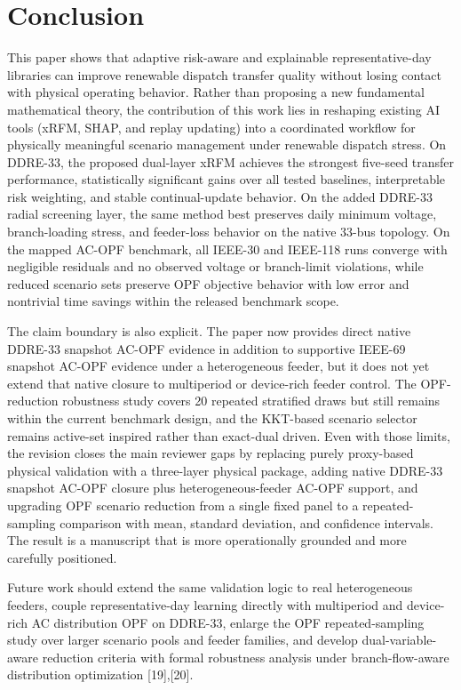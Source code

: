 \documentclass[journal]{IEEEtran}
\begin{document}
\section{Conclusion}
This paper shows that adaptive risk-aware and explainable representative-day libraries can improve renewable dispatch transfer quality without losing contact with physical operating behavior. Rather than proposing a new fundamental mathematical theory, the contribution of this work lies in reshaping existing AI tools (xRFM, SHAP, and replay updating) into a coordinated workflow for physically meaningful scenario management under renewable dispatch stress. On DDRE-33, the proposed dual-layer xRFM achieves the strongest five-seed transfer performance, statistically significant gains over all tested baselines, interpretable risk weighting, and stable continual-update behavior. On the added DDRE-33 radial screening layer, the same method best preserves daily minimum voltage, branch-loading stress, and feeder-loss behavior on the native 33-bus topology. On the mapped AC-OPF benchmark, all IEEE-30 and IEEE-118 runs converge with negligible residuals and no observed voltage or branch-limit violations, while reduced scenario sets preserve OPF objective behavior with low error and nontrivial time savings within the released benchmark scope.

The claim boundary is also explicit. The paper now provides direct native DDRE-33 snapshot AC-OPF evidence in addition to supportive IEEE-69 snapshot AC-OPF evidence under a heterogeneous feeder, but it does not yet extend that native closure to multiperiod or device-rich feeder control. The OPF-reduction robustness study covers 20 repeated stratified draws but still remains within the current benchmark design, and the KKT-based scenario selector remains active-set inspired rather than exact-dual driven. Even with those limits, the revision closes the main reviewer gaps by replacing purely proxy-based physical validation with a three-layer physical package, adding native DDRE-33 snapshot AC-OPF closure plus heterogeneous-feeder AC-OPF support, and upgrading OPF scenario reduction from a single fixed panel to a repeated-sampling comparison with mean, standard deviation, and confidence intervals. The result is a manuscript that is more operationally grounded and more carefully positioned.

Future work should extend the same validation logic to real heterogeneous feeders, couple representative-day learning directly with multiperiod and device-rich AC distribution OPF on DDRE-33, enlarge the OPF repeated-sampling study over larger scenario pools and feeder families, and develop dual-variable-aware reduction criteria with formal robustness analysis under branch-flow-aware distribution optimization [19],[20].
\end{document}
